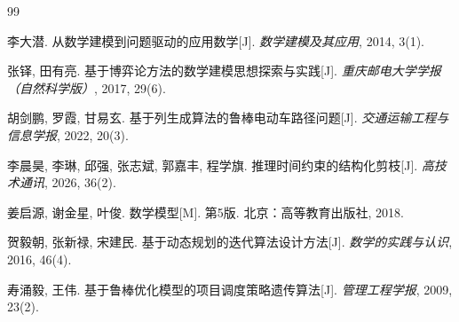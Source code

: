 \documentclass{cumcmthesis}
\numberwithin{equation}{section}
\numberwithin{figure}{section}
\numberwithin{table}{section}
\begin{document}
 \begin{thebibliography}{99}

   
    李大潜.
    从数学建模到问题驱动的应用数学[J].
    \textit{数学建模及其应用}, 2014, 3(1).

    张铎, 田有亮.
    基于博弈论方法的数学建模思想探索与实践[J].
    \textit{重庆邮电大学学报（自然科学版）}, 2017, 29(6).

    胡剑鹏, 罗霞, 甘易玄.
    基于列生成算法的鲁棒电动车路径问题[J].
    \textit{交通运输工程与信息学报}, 2022, 20(3).

    李晨昊, 李琳, 邱强, 张志斌, 郭嘉丰, 程学旗.
    推理时间约束的结构化剪枝[J].
    \textit{高技术通讯}, 2026, 36(2).

    姜启源, 谢金星, 叶俊.
    数学模型[M].
    第5版. 北京：高等教育出版社, 2018.

    贺毅朝, 张新禄, 宋建民.
    基于动态规划的迭代算法设计方法[J].
    \textit{数学的实践与认识}, 2016, 46(4).

    寿涌毅, 王伟.
    基于鲁棒优化模型的项目调度策略遗传算法[J].
    \textit{管理工程学报}, 2009, 23(2).


\end{thebibliography}
\newpage
\end{document}

